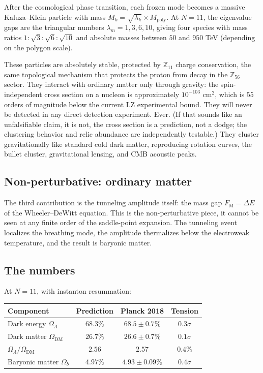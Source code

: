 After the cosmological phase transition, each frozen mode becomes a
massive Kaluza--Klein particle with mass
$M_k = \sqrt{\lambda_k} \times M_{\mathrm{poly}}$. At $N = 11$,
the eigenvalue gaps are the triangular numbers $\lambda_m = 1, 3, 6,
10$, giving four species with mass ratios
$1 : \sqrt{3} : \sqrt{6} : \sqrt{10}$ and absolute masses between
$50$ and $950$ TeV (depending on the polygon scale).

These particles are absolutely stable, protected by
$\mathbb{Z}_{11}$ charge conservation, the same topological mechanism
that protects the proton from decay in the $\mathbb{Z}_{56}$ sector.
They interact with ordinary matter only through gravity: the
spin-independent cross section on a nucleon is approximately
$10^{-103}$ cm$^2$, which is $55$ orders of magnitude below the
current LZ experimental bound. They will never be detected in any
direct detection experiment. Ever. (If that sounds like an unfalsifiable
claim, it is not, the cross section is a prediction, not a dodge;
the clustering behavior and relic abundance are independently
testable.) They cluster gravitationally like
standard cold dark matter, reproducing rotation curves, the bullet
cluster, gravitational lensing, and CMB acoustic peaks.

\subsection*{Non-perturbative: ordinary matter}

The third contribution is the tunneling amplitude itself: the mass gap
$F_{\mathrm{M}} = \Delta E$ of the Wheeler--DeWitt equation. This is
the non-perturbative piece, it cannot be seen at any finite order of
the saddle-point expansion. The tunneling event localizes the
breathing mode, the amplitude thermalizes below the electroweak
temperature, and the result is baryonic matter.

\subsection*{The numbers}

At $N = 11$, with instanton resummation:
\begin{center}
\small
\begin{tabular}{lccc}
\toprule
Component & Prediction & Planck 2018 & Tension \\
\midrule
Dark energy $\Omega_\Lambda$ & $68.3\%$ & $68.5 \pm 0.7\%$ & $0.3\sigma$ \\
Dark matter $\Omega_{\mathrm{DM}}$ & $26.7\%$ & $26.6 \pm 0.7\%$ & $0.1\sigma$ \\
$\Omega_\Lambda / \Omega_{\mathrm{DM}}$ & $2.56$ & $2.57$ & $0.4\%$ \\
Baryonic matter $\Omega_b$ & $4.97\%$ & $4.93 \pm 0.09\%$ & $0.4\sigma$ \\
\bottomrule
\end{tabular}
\end{center}


